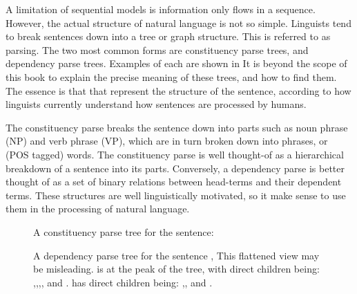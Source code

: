 \documentclass[12pt,parskip]{komatufte}
\begin{document}
A limitation of sequential models is information only flows in a sequence.
However, the actual structure of natural language is not so simple.
Linguists tend to break sentences down into a tree or graph structure.
This is referred to as parsing.
The two most common forms are constituency parse trees, and dependency parse trees.
Examples of each are shown in 
It is beyond the scope of this book to explain the precise meaning of these trees, and how to find them.
The essence is that that represent the structure of the sentence,
according to how linguists currently understand how sentences are processed by humans.

The constituency parse breaks the sentence down into parts such as noun phrase (NP) and verb phrase (VP),
which are in turn broken down into phrases, or (POS tagged) words.
The constituency parse is well thought-of as a hierarchical breakdown of a sentence into its parts.
Conversely, a dependency parse is better thought of as a set of binary relations between head-terms and their dependent terms.
These structures are well linguistically motivated, so it make sense to use them in the processing of natural language.

\begin{figure}
	\caption{A constituency parse tree for the sentence: }
	\label{fig:consparse}
\end{figure}


\begin{figure}
	\caption{A dependency parse tree for the sentence ,
	This flattened view may be misleading.
	 is at the peak of the tree, with direct children	being:
	,,,,
	and .
	 has direct children being: ,, and .
	}
	\label{fig:depparse}
\end{figure}


\end{document}
